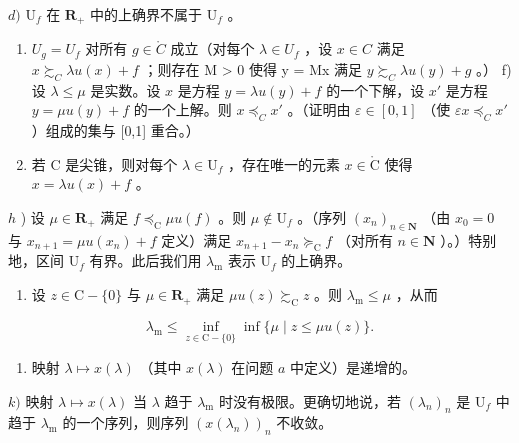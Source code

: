 \(d)\) \(\mathrm{U}_{f}\) 在 \(\mathbf{R}_{+}\) 中的上确界不属于 \(\mathrm{U}_{f}\) 。

\begin{enumerate}
\def\labelenumi{\alph{enumi})}
\setcounter{enumi}{4}
\item
  \(U_{g} = U_{f}\) 对所有 \(g \in \mathring{C}\) 成立（对每个 \(\lambda \in U_{f}\) ，设 \(x \in C\) 满足 \(x \succsim_{C} \lambda u(x) + f\) ；则存在 M \textgreater{} 0 使得 y = Mx 满足 \(y \succsim_{C} \lambda u(y) + g\) 。） f) 设 \(\lambda \leqslant \mu\) 是实数。设 \(x\) 是方程 \(y = \lambda u(y) + f\) 的一个下解，设 \(x'\) 是方程 \(y = \mu u(y) + f\) 的一个上解。则 \(x \preccurlyeq_{C} x'\) 。（证明由 \(\varepsilon \in [0,1]\) （使 \(\varepsilon x \preccurlyeq_{C} x'\) ）组成的集与 {[}0,1{]} 重合。）
\item
  若 C 是尖锥，则对每个 \(\lambda \in \mathrm{U}_f\) ，存在唯一的元素 \(x \in \mathring{\mathrm{C}}\) 使得 \(x = \lambda u(x) + f\) 。
\end{enumerate}

\(h\) ) 设 \(\mu\in\mathbf{R}_{+}\) 满足 \(f\preccurlyeq_{\mathrm{C}}\mu u(f)\) 。则 \(\mu\notin\mathrm{U}_{f}\) 。（序列 \((x_{n})_{n\in\mathbf{N}}\) （由 \(x_{0}=0\) 与 \(x_{n+1}=\mu u(x_{n})+f\) 定义）满足 \(x_{n+1}-x_{n}\succcurlyeq_{\mathrm{C}}f\) （对所有 \(n\in\mathbf{N}\) ）。）特别地，区间 \(\mathrm{U}_{f}\) 有界。此后我们用 \(\lambda_{\mathrm{m}}\) 表示 \(\mathrm{U}_{f}\) 的上确界。

\begin{enumerate}
\def\labelenumi{\roman{enumi})}
\tightlist
\item
  设 \(z \in \mathrm{C} - \{0\}\) 与 \(\mu \in \mathbf{R}_+\) 满足 \(\mu u(z) \succsim_{\mathrm{C}} z\) 。则 \(\lambda_{\mathrm{m}} \leqslant \mu\) ，从而
\end{enumerate}

\[
\lambda_ {\mathrm{m}} \leqslant \inf _ {z \in \mathrm{C} - \{0 \}} \inf \{\mu \mid z \leqslant \mu u (z) \}.
\]

\begin{enumerate}
\def\labelenumi{\alph{enumi})}
\setcounter{enumi}{9}
\tightlist
\item
  映射 \(\lambda \mapsto x(\lambda)\) （其中 \(x(\lambda)\) 在问题 \(a\) 中定义）是递增的。
\end{enumerate}

\(k)\) 映射 \(\lambda \mapsto x(\lambda)\) 当 \(\lambda\) 趋于 \(\lambda_{\mathrm{m}}\) 时没有极限。更确切地说，若 \((\lambda_n)_n\) 是 \(\mathrm{U}_f\) 中趋于 \(\lambda_{\mathrm{m}}\) 的一个序列，则序列 \((x(\lambda_n))_n\) 不收敛。

